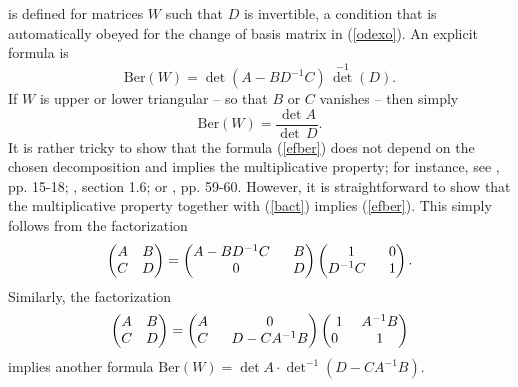 \documentclass[11pt,a4paper]{article}
\def\Ber{{\mathrm {Ber}}}
\begin{document}
is defined for matrices $W$  such that $D$ is invertible, a condition that is automatically obeyed for the change of basis matrix in (\ref{odexo}).
An explicit formula is
\begin{equation}\label{efber}\Ber(W)=\det(A-BD^{-1}C)\,{\det}^{-1}(D).\end{equation}
If $W$ is upper or lower triangular -- so that $B$ or $C$ vanishes -- then simply
\begin{equation}\label{bact}\Ber(W)=\frac{\det A}{\det\,D}. \end{equation}  It is rather tricky to show that the formula (\ref{efber}) does not depend on the 
chosen decomposition and implies the multiplicative property; for instance, see \cite{Leites}, pp. 15-18; \cite{DeWitt}, section 1.6; or \cite{DEF}, pp. 59-60.
However, it is straightforward to show that the multiplicative property together with (\ref{bact}) implies (\ref{efber}).  This simply follows from the factorization
\begin{equation}\label{formfact}\begin{pmatrix}A&B\cr C&D\end{pmatrix}=\begin{pmatrix}A-BD^{-1}C ~~& B\cr 0 & D\end{pmatrix}\begin{pmatrix}1& 0 \cr D^{-1}C~~ & 1\end
{pmatrix}.\end{equation}
Similarly, the factorization
\begin{equation}\label{tormfact}\begin{pmatrix}A&B\cr C&D\end{pmatrix}=\begin{pmatrix}A~~& 0\cr C~~ & D-CA^{-1}B\end{pmatrix}\begin{pmatrix}1& A^{-1}B \cr 0~~ & 1\end{pmatrix}\end{equation}
implies another formula $\Ber(W)=\det A\cdot {\det}^{-1}(D-CA^{-1}B)$.
\end{document}
